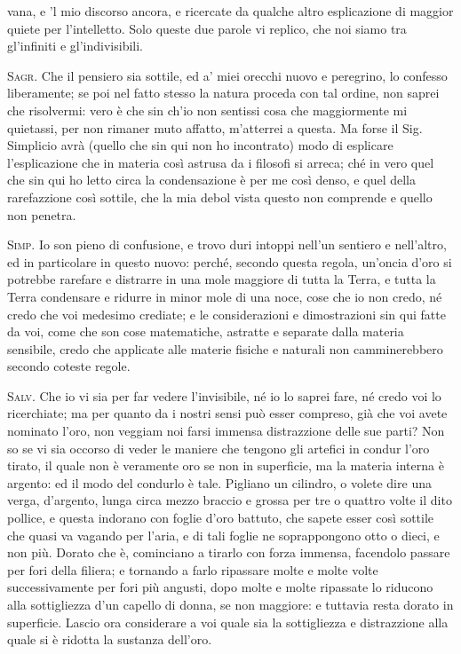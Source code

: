 \documentclass[11pt,twoside,openany]{book}
\newcommand{\speaker}[1]{\textcolor{rubric}{\textsc{#1}}\space}
\begin{document}
vana, e 'l mio discorso ancora, e ricercate da qualche altro esplicazione di maggior quiete per l'intelletto. Solo queste due parole vi replico, che noi siamo tra gl'infiniti e gl'indivisibili.

\speaker{Sagr.} Che il pensiero sia sottile, ed a' miei orecchi nuovo e peregrino, lo confesso liberamente; se poi nel fatto stesso la natura proceda con tal ordine, non saprei che risolvermi: vero è che sin ch'io non sentissi cosa che maggiormente mi quietassi, per non rimaner muto affatto, m'atterrei a questa. Ma forse il Sig. Simplicio avrà (quello che sin qui non ho incontrato) modo di esplicare l'esplicazione che in materia così astrusa da i filosofi si arreca; ché in vero quel che sin qui ho letto circa la condensazione è per me così denso, e quel della rarefazzione così sottile, che la mia debol vista questo non comprende e quello non penetra.

\speaker{Simp.} Io son pieno di confusione, e trovo duri intoppi nell'un sentiero e nell'altro, ed in particolare in questo nuovo: perché, secondo questa regola, un'oncia d'oro si potrebbe rarefare e distrarre in una mole maggiore di tutta la Terra, e tutta la Terra condensare e ridurre in minor mole di una noce, cose che io non credo, né credo che voi medesimo crediate; e le considerazioni e dimostrazioni sin qui fatte da voi, come che son cose matematiche, astratte e separate dalla materia sensibile, credo che applicate alle materie fisiche e naturali non camminerebbero secondo coteste regole.

\speaker{Salv.} Che io vi sia per far vedere l'invisibile, né io lo saprei fare, né credo voi lo ricerchiate; ma per quanto da i nostri sensi può esser compreso, già che voi avete nominato l'oro, non veggiam noi farsi immensa distrazzione delle sue parti? Non so se vi sia occorso di veder le maniere che tengono gli artefici in condur l'oro tirato, il quale non è veramente oro se non in superficie, ma la materia interna è argento: ed il modo del condurlo è tale. Pigliano un cilindro, o volete dire una verga, d'argento, lunga circa mezzo braccio e grossa per tre o quattro volte il dito pollice, e questa indorano con foglie d'oro battuto, che sapete esser così sottile che quasi va vagando per l'aria, e di tali foglie ne soprappongono otto o dieci, e non più. Dorato che è, cominciano a tirarlo con forza immensa, facendolo passare per fori della filiera; e tornando a farlo ripassare molte e molte volte successivamente per fori più angusti, dopo molte e molte ripassate lo riducono alla sottigliezza d'un capello di donna, se non maggiore: e tuttavia resta dorato in superficie. Lascio ora considerare a voi quale sia la sottigliezza e distrazzione alla quale si è ridotta la sustanza dell'oro.
\end{document}
